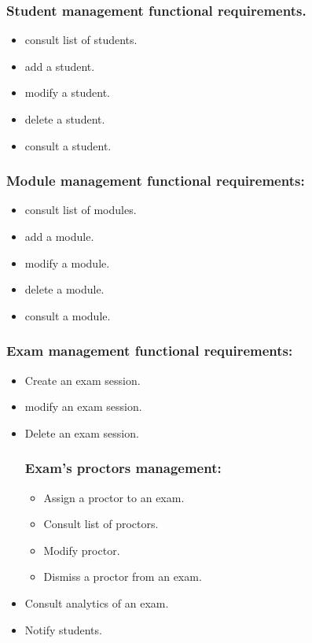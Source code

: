 \documentclass[a4paper,12p]{article}
\begin{document}
\begin{itemize}
\begin{itemize}
            \subsubsection{Student management functional requirements.}
            \begin{itemize}
                \item consult list of students.
                \item add a student.
                \item modify a student.
                \item delete a student.
                \item consult a student.
            \end{itemize}

        \end{itemize}

        \subsubsection{Module management functional requirements:}
        \begin{itemize}
            \item consult list of modules.
            \item add a module.
            \item modify a module.
            \item delete a module.
            \item consult a module.
        \end{itemize}

        \subsubsection{Exam management functional requirements:}
        \begin{itemize}
            \item Create an exam session.
            \item modify an exam session.
            \item Delete an exam session.
            \subsubsection{Exam's proctors management:}
            \begin{itemize}
                \item Assign a proctor to an exam.
                \item Consult list of proctors.
                \item Modify proctor.
                \item Dismiss a proctor from an exam.
            \end{itemize}
            \item Consult analytics of an exam.
            \item Notify students.

\end{itemize}
\end{itemize}
\end{document}
